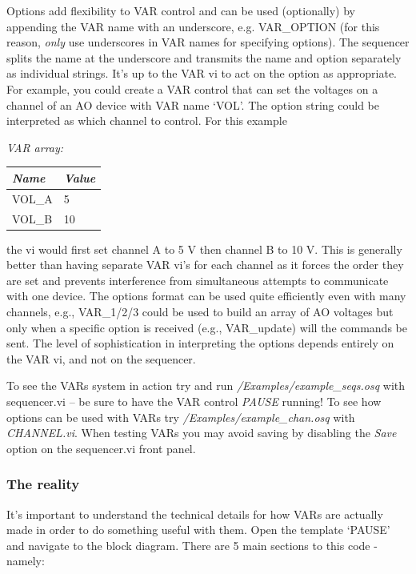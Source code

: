 \documentclass[10pt,a4paper]{article}
\begin{document}
Options add flexibility to VAR control and can be used (optionally) by appending the VAR name with an underscore, e.g. VAR\_OPTION (for this reason, \emph{only} use underscores in VAR names for specifying options).  The sequencer splits the name at the underscore and transmits the name and option separately as individual strings.  It's up to the VAR vi to act on the option as appropriate.  For example, you could create a VAR control that can set the voltages on a channel of an AO device with VAR name `VOL'.  The option string could be interpreted as which channel to control. For this example

\hangindent=0.7cm
\emph{VAR array:} \\
\begin{tabularx}{0.3\textwidth}{X|X}
	\emph{Name} & \emph{Value} \\
	\hline
	VOL\_A & 5 \\
	VOL\_B & 10 \\
\end{tabularx}
\vspace{2mm}

\noindent the vi would first set channel A to 5 V then channel B to 10 V.  This is generally better than having separate VAR vi's for each channel as it forces the order they are set and prevents interference from simultaneous attempts to communicate with one device.  The options format can be used quite efficiently even with many channels, e.g., VAR\_1/2/3 could be used to build an array of AO voltages but only when a specific option is received (e.g., VAR\_update) will the commands be sent.  The level of sophistication in interpreting the options depends entirely on the VAR vi, and not on the sequencer. 

To see the VARs system in action try and run \emph{/Examples/example\_seqs.osq} with sequencer.vi -- be sure to have the VAR control \emph{PAUSE} running!  To see how options can be used with VARs try \emph{/Examples/example\_chan.osq} with \emph{CHANNEL.vi}. When testing VARs you may avoid saving by disabling the \emph{Save} option on the sequencer.vi front panel.

\subsubsection{The reality}

It's important to understand the technical details for how VARs are actually made in order to do something useful with them.  Open the template `PAUSE' and navigate to the block diagram.  There are 5 main sections to this code - namely:
\end{document}
